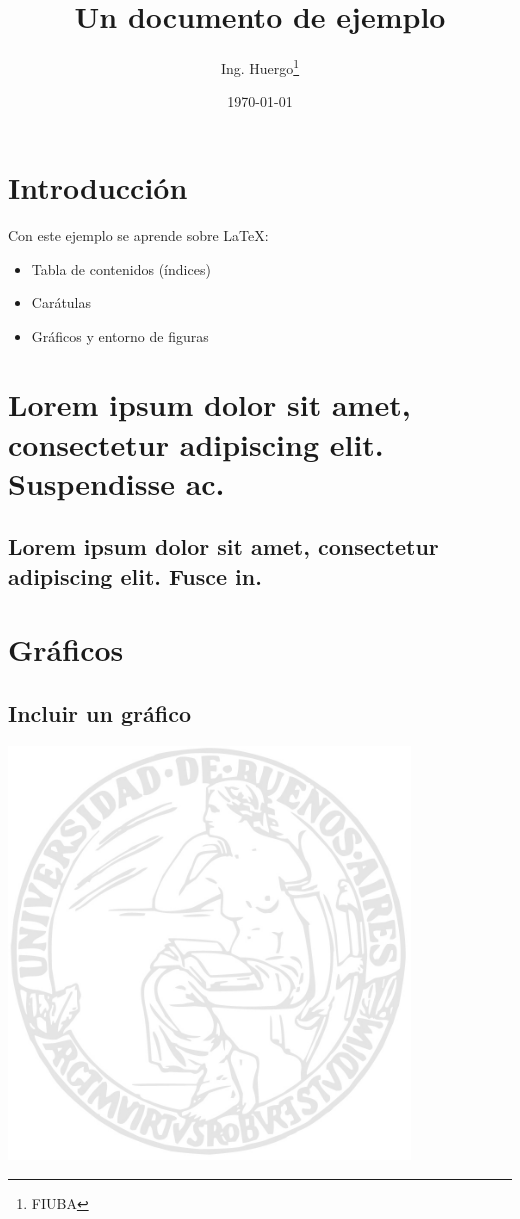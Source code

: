 \documentclass{article}
\begin{document}
\title{Un documento de ejemplo} %
\date{\today} %
\author{Ing. Huergo\thanks{FIUBA}} %

\maketitle %

\newpage %

\tableofcontents %

\newpage %

\section*{Introducción}

Con este ejemplo se aprende sobre LaTeX:

\begin{itemize}
  \item Tabla de contenidos (índices)
  \item Carátulas
  \item Gráficos y entorno de figuras
\end{itemize}

\section{Lorem ipsum dolor sit amet, consectetur adipiscing elit. Suspendisse ac.}

\subsection[Fusce in]{Lorem ipsum dolor sit amet, consectetur adipiscing elit. Fusce in.}

\section{Gráficos}

\subsection{Incluir un gráfico}

\includegraphics[width=0.8\textwidth]{logo_uba}
\end{document}
